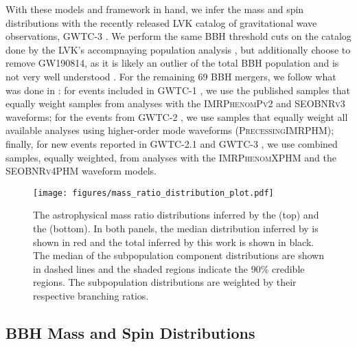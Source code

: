 With these models and framework in hand, we infer the mass and spin distributions with the recently released LVK catalog of gravitational wave observations, GWTC-3 \citep{2021arXiv211103606T}. We perform the same BBH threshold cuts on the catalog done by the LVK's accompnaying population analysis \othreea{}, but additionally choose to remove GW190814, as it is likely an outlier of the total BBH population and is not very well understood \citep{2010.14533,2111.03634, 2109.00418}. For the remaining 69 BBH mergers, we follow what was done in \citet{2021arXiv211103606T}: for events included in GWTC-1 \citep{2019ApJ...882L..24A}, we use the published samples that equally weight samples from analyses with the \textsc{IMRPhenomPv2} \citep{1308.3271} and \textsc{SEOBNRv3} \citep{1307.6232,1311.2544} waveforms; for the events from GWTC-2 \citep{2021ApJ...913L...7A}, we use samples that equally weight all available analyses using higher-order mode waveforms (\textsc{PrecessingIMRPHM}); finally, for new events reported in GWTC-2.1 and GWTC-3 \citep{2021arXiv211103606T,2108.01045}, we use combined samples, equally weighted, from analyses with the \textsc{IMRPhenomXPHM} \citep{2004.06503} and the \textsc{SEOBNRv4PHM} \citep{2004.09442} waveform models.

\begin{figure}[ht!]
    \begin{centering}
        \texttt{[image: figures/mass\_ratio\_distribution\_plot.pdf]}
        \caption{The astrophysical mass ratio distributions inferred by the \base{} (top) and the \comp{} (bottom). In both panels, the median distribution inferred by \brucepaper is shown in red and the total inferred by this work is shown in black. The median of the subpopulation component distributions are shown in dashed lines and the shaded regions indicate the $90\%$ credible regions. The subpopulation distributions are weighted by their respective branching ratios.}
        \label{fig:mass_ratio_distribution}
    \end{centering}
\end{figure}

\subsection{BBH Mass and Spin Distributions}


